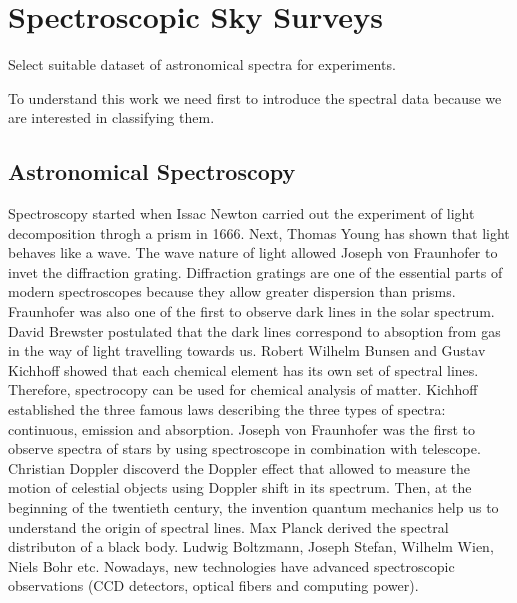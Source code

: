 \chapter{Spectroscopic Sky Surveys}
\label{data_chapter}


Select suitable dataset of astronomical spectra for experiments.

To understand this work we need first to introduce the spectral
data because we are interested in classifying them.

\section{Astronomical Spectroscopy}

Spectroscopy started when Issac Newton carried out the experiment of light decomposition throgh a prism in 1666.
Next, Thomas Young has shown that light behaves like a wave.
The wave nature of light allowed Joseph von Fraunhofer to invet the diffraction grating.
Diffraction gratings are one of the essential parts of modern spectroscopes
because they allow greater dispersion than prisms.
Fraunhofer was also one of the first to observe dark lines in the solar spectrum.
David Brewster postulated that the dark lines correspond to absoption from gas in the way of light travelling towards us.
Robert Wilhelm Bunsen and Gustav Kichhoff showed that each chemical element has its own set of spectral lines.
Therefore, spectrocopy can be used for chemical analysis of matter.
Kichhoff established the three famous laws describing the three types of spectra:
continuous, emission and absorption.
Joseph von Fraunhofer was the first to observe spectra of stars by using spectroscope in combination with telescope.
Christian Doppler discoverd the Doppler effect that allowed to measure the motion of celestial objects using Doppler shift in its spectrum.
Then, at the beginning of the twentieth century,
the invention quantum mechanics help us to understand the origin of spectral lines.
Max Planck derived the spectral distributon of a black body.
Ludwig Boltzmann, Joseph Stefan, Wilhelm Wien, Niels Bohr etc.
Nowadays, new technologies have advanced spectroscopic observations
(CCD detectors, optical fibers and computing power).~\cite{cochard2018}

